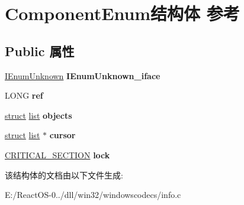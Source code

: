 \hypertarget{struct_component_enum}{}\section{Component\+Enum结构体 参考}
\label{struct_component_enum}
\subsection*{Public 属性}
\begin{DoxyCompactItemize}
\item 
\mbox{\label{struct_component_enum_a134c83893e4aca0ffb7710b55a9b2d7f}} 
\hyperlink{interface_i_enum_unknown}{I\+Enum\+Unknown} {\bfseries I\+Enum\+Unknown\+\_\+iface}
\item 
\mbox{\label{struct_component_enum_a632b6b62edbe1b1e372d4365ae22e12b}} 
L\+O\+NG {\bfseries ref}
\item 
\mbox{\label{struct_component_enum_a9b1b2c544beb745ec98de4e658214564}} 
\hyperlink{interfacestruct}{struct} \hyperlink{classlist}{list} {\bfseries objects}
\item 
\mbox{\label{struct_component_enum_afc0190a53043dae1b862ed51ffdfe9e8}} 
\hyperlink{interfacestruct}{struct} \hyperlink{classlist}{list} $\ast$ {\bfseries cursor}
\item 
\mbox{\label{struct_component_enum_a77976a35b514bcd9cf213a479ceeeaf1}} 
\hyperlink{struct___c_r_i_t_i_c_a_l___s_e_c_t_i_o_n}{C\+R\+I\+T\+I\+C\+A\+L\+\_\+\+S\+E\+C\+T\+I\+ON} {\bfseries lock}
\end{DoxyCompactItemize}


该结构体的文档由以下文件生成\+:\begin{DoxyCompactItemize}
\item 
E\+:/\+React\+O\+S-\/0../dll/win32/windowscodecs/info.\+c\end{DoxyCompactItemize}
